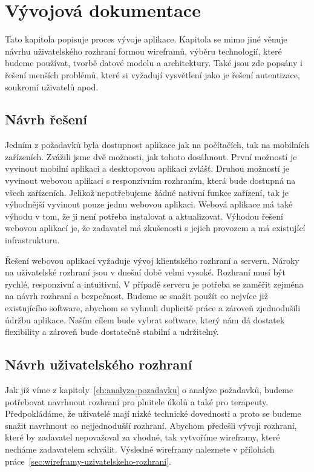 \chapter{Vývojová dokumentace}\label{ch:vyvojova-dokumentace}

Tato kapitola popisuje proces vývoje aplikace.
Kapitola se mimo jiné věnuje návrhu uživatelského rozhraní formou wireframů, výběru technologií, které budeme používat, tvorbě datové modelu a architektury.
Také jsou zde popsány i řešení menších problémů, které si vyžadují vysvětlení jako je řešení autentizace, soukromí uživatelů apod.

\section{Návrh řešení}\label{sec:navrh-reseni}

Jedním z požadavků byla dostupnost aplikace jak na počítačích, tak na mobilních zařízeních.
Zvážili jsme dvě možnosti, jak tohoto dosáhnout.
První možností je vyvinout mobilní aplikaci a desktopovou aplikaci zvlášť.
Druhou možností je vyvinout webovou aplikaci s responzivním rozhraním, která bude dostupná na všech zařízeních.
Jelikož nepotřebujeme žádné nativní funkce zařízení, tak je výhodnější vyvinout pouze jednu webovou aplikaci.
Webová aplikace má také výhodu v tom, že ji není potřeba instalovat a aktualizovat.
Výhodou řešení webovou aplikací je, že zadavatel má zkušenosti s jejich provozem a má existující infrastrukturu.

Řešení webovou aplikací vyžaduje vývoj klientského rozhraní a serveru.
Nároky na uživatelské rozhraní jsou v dnešní době velmi vysoké.
Rozhraní musí být rychlé, responzivní a intuitivní.
V případě serveru je potřeba se zaměřit zejména na návrh rozhraní a bezpečnost.
Budeme se snažit použít co nejvíce již existujícího software, abychom se vyhnuli duplicitě práce a zároveň zjednodušili údržbu aplikace.
Naším cílem bude vybrat software, který nám dá dostatek flexibility a zároveň bude dostatečně stabilní a udržitelný.

\section{Návrh uživatelského rozhraní}\label{sec:navrh-uzivatelskeho-rozhrani}

Jak již víme z kapitoly~\ref{ch:analyza-pozadavku} o analýze požadavků, budeme potřebovat navrhnout rozhraní pro plnitele úkolů a také pro terapeuty.
Předpokládáme, že uživatelé mají nízké technické dovednosti a proto se budeme snažit navrhnout co nejjednodušší rozhraní.
Abychom předešli vývoji rozhraní, které by zadavatel nepovažoval za vhodné, tak vytvoříme wireframy, které necháme zadavatelem schválit.
Výsledné wireframy naleznete v přílohách práce~\ref{sec:wireframy-uzivatelskeho-rozhrani}.

